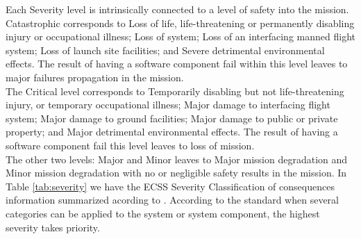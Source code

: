 Each Severity level is intrinsically connected to a level of safety into the mission. Catastrophic corresponds to
Loss of life, life-threatening or permanently disabling injury or occupational illness; Loss of system; 
Loss of an interfacing manned flight system; Loss of launch site facilities; and Severe detrimental environmental effects. The result
of having a software component fail within this level leaves to major failures propagation in the mission\cite{ecss-q-st-30c}.\\
The Critical level corresponds to Temporarily disabling but not life-threatening injury, or temporary occupational illness;
Major damage to interfacing flight system; Major damage to ground facilities; Major damage to public or private property;
and Major detrimental environmental effects. The result of having a software component fail this level leaves to loss of mission.\\
The other two levels: Major and Minor leaves to Major mission degradation and Minor mission degradation with no or negligible safety results in the mission.
In Table \ref{tab:severity} we have the \ac{ECSS} Severity Classification of consequences information summarized acording to \cite{ecss-q-st-40c}.
According to the standard
when several categories can be applied to the system or system component, the highest severity takes priority.
